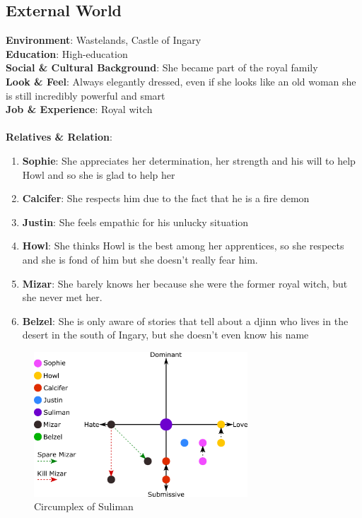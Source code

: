 \subsection{External World}
\textbf{Environment}: Wastelands, Castle of Ingary \\
\textbf{Education}: High-education \\
\textbf{Social \& Cultural Background}: She became part of the royal family \\
\textbf{Look \& Feel}: Always elegantly dressed, even if she looks like an old woman she is still incredibly powerful and smart \\
\textbf{Job \& Experience}: Royal witch\\
\\
\textbf{Relatives \& Relation}:
\begin{enumerate}
\item \textbf{Sophie}: She appreciates her determination, her strength and his will to help Howl and so she is glad to help her
\item \textbf{Calcifer}: She respects him due to the fact that he is a fire demon
\item \textbf{Justin}: She feels empathic for his unlucky situation
\item \textbf{Howl}: She thinks Howl is the best among her apprentices, so she respects and she is fond of him but she doesn't really  fear him.
\item \textbf{Mizar}: She barely knows her because she were the former royal witch, but she never met her.
\item \textbf{Belzel}: She is only aware of stories that tell about a djinn who lives in the desert in the south of Ingary, but she doesn't even know his name
\end{enumerate}

\begin{figure}
  \centering
  \includegraphics[width=8cm]{Images/Circumplexes/sulimanCircumplex}
  \caption{Circumplex of Suliman}
\end{figure}

